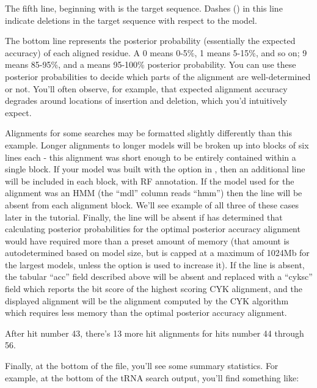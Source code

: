 The fifth line, beginning with  is
the target sequence. Dashes (\otext{-}) in this line indicate deletions
in the target sequence with respect to the model.

The bottom line represents the posterior probability (essentially the
expected accuracy) of each aligned residue. A 0 means 0-5\%, 1 means
5-15\%, and so on; 9 means 85-95\%, and a \otext{*} means 95-100\%
posterior probability. You can use these posterior probabilities to
decide which parts of the alignment are well-determined or not. You'll
often observe, for example, that expected alignment accuracy degrades
around locations of insertion and deletion, which you'd intuitively
expect.

Alignments for some searches may be formatted slightly differently
than this example. Longer alignments to longer models will be broken
up into blocks of six lines each - this alignment was short enough to
be entirely contained within a single block.  If your model was built
with the  option in , then an additional
line will be included in each block, with RF annotation.  If the model
used for the alignment was an HMM (the ``mdl'' column reads ``hmm'')
then the  line will be absent from each alignment
block. We'll see example of all three of these cases later in the
tutorial. Finally, the  line will be absent if
 has determined that calculating posterior
probabilities for the optimal posterior accuracy alignment would have
required more than a preset amount of memory (that amount is
autodetermined based on model size, but is capped at a maximum of
1024Mb for the largest models, unless the  option is
used to increase it). If the  line is absent, the tabular
``acc'' field described above will be absent and replaced with a
``cyksc'' field which reports the bit score of the highest scoring CYK
alignment, and the displayed alignment will be the alignment computed
by the CYK algorithm which requires less memory than the optimal
posterior accuracy alignment.

After hit number 43, there's 13 more hit alignments for hits number 44
through 56. 

Finally, at the bottom of the file, you'll see some summary
statistics. For example, at the bottom of the tRNA search output,
you'll find something like:

